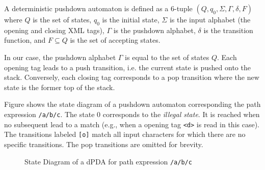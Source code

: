 A deterministic pushdown automaton is defined as a 6-tuple $(Q, q_0, \Sigma,
\Gamma, \delta, F)$ where $Q$ is the set of states, $q_0$ is the initial state,
$\Sigma$ is the input alphabet (the opening and closing XML tags), $\Gamma$ is
the pushdown alphabet, $\delta$ is the transition function, and $F \subseteq Q$ is
the set of accepting states.

In our case, the pushdown alphabet $\Gamma$ is equal to the set of states $Q$.
Each opening tag leads to a push transition, i.e. the current state is pushed
onto the stack. Conversely, each closing tag corresponds to a pop transition
where the new state is the former top of the stack.


Figure \todo{ } shows the state diagram of a pushdown automaton corresponding the
path expression \verb;/a/b/c;. The state $0$ corresponds to the \emph{illegal
state}. It is reached when no subsequent lead to a match (e.g., when a opening
tag \verb;<d>; is read in this case). The transitions labeled \verb;[o]; match
all input characters for which there are no specific transitions. The pop
transitions are omitted for brevity.

\begin{figure}
\centering
{}
\caption{State Diagram of a dPDA for path expression \texttt{/a/b/c}}
\end{figure}





